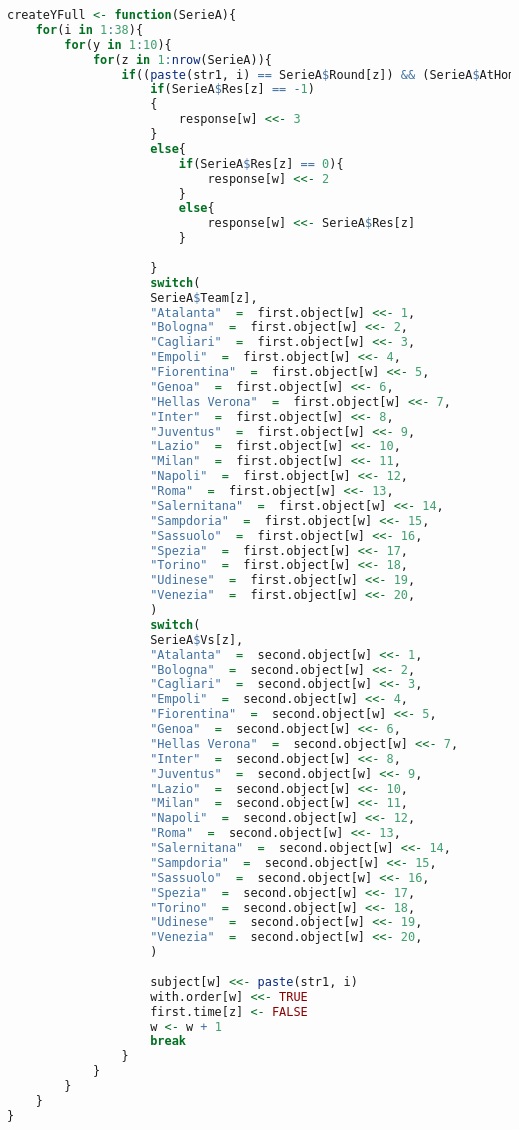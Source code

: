 \begin{lstlisting}[language=R, caption={Codice per la creazione della variabile Y3.}, captionpos=b, label=code:a4]
createYFull <- function(SerieA){
	for(i in 1:38){
		for(y in 1:10){
			for(z in 1:nrow(SerieA)){
				if((paste(str1, i) == SerieA$Round[z]) && (SerieA$AtHome[z] == TRUE )  && (first.time[z] == TRUE)){
					if(SerieA$Res[z] == -1)
					{
						response[w] <<- 3
					}
					else{
						if(SerieA$Res[z] == 0){
							response[w] <<- 2
						}
						else{
							response[w] <<- SerieA$Res[z]
						}
						
					}              
					switch(
					SerieA$Team[z],
					"Atalanta"  =  first.object[w] <<- 1,
					"Bologna"  =  first.object[w] <<- 2,       
					"Cagliari"  =  first.object[w] <<- 3,      
					"Empoli"  =  first.object[w] <<- 4,        
					"Fiorentina"  =  first.object[w] <<- 5,    
					"Genoa"  =  first.object[w] <<- 6,         
					"Hellas Verona"  =  first.object[w] <<- 7, 
					"Inter"  =  first.object[w] <<- 8,        
					"Juventus"  =  first.object[w] <<- 9,     
					"Lazio"  =  first.object[w] <<- 10,         
					"Milan"  =  first.object[w] <<- 11,         
					"Napoli"  =  first.object[w] <<- 12,        
					"Roma"  =  first.object[w] <<- 13,          
					"Salernitana"  =  first.object[w] <<- 14,   
					"Sampdoria"  =  first.object[w] <<- 15,     
					"Sassuolo"  =  first.object[w] <<- 16,     
					"Spezia"  =  first.object[w] <<- 17,        
					"Torino"  =  first.object[w] <<- 18,        
					"Udinese"  =  first.object[w] <<- 19,       
					"Venezia"  =  first.object[w] <<- 20,      
					)
					switch(
					SerieA$Vs[z],
					"Atalanta"  =  second.object[w] <<- 1,
					"Bologna"  =  second.object[w] <<- 2,       
					"Cagliari"  =  second.object[w] <<- 3,      
					"Empoli"  =  second.object[w] <<- 4,        
					"Fiorentina"  =  second.object[w] <<- 5,    
					"Genoa"  =  second.object[w] <<- 6,         
					"Hellas Verona"  =  second.object[w] <<- 7, 
					"Inter"  =  second.object[w] <<- 8,        
					"Juventus"  =  second.object[w] <<- 9,     
					"Lazio"  =  second.object[w] <<- 10,         
					"Milan"  =  second.object[w] <<- 11,         
					"Napoli"  =  second.object[w] <<- 12,        
					"Roma"  =  second.object[w] <<- 13,          
					"Salernitana"  =  second.object[w] <<- 14,   
					"Sampdoria"  =  second.object[w] <<- 15,     
					"Sassuolo"  =  second.object[w] <<- 16,     
					"Spezia"  =  second.object[w] <<- 17,        
					"Torino"  =  second.object[w] <<- 18,        
					"Udinese"  =  second.object[w] <<- 19,       
					"Venezia"  =  second.object[w] <<- 20,      
					)
					
					subject[w] <<- paste(str1, i)
					with.order[w] <<- TRUE
					first.time[z] <- FALSE
					w <- w + 1
					break
				}
			}
		}
	}
}
\end{lstlisting}

